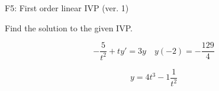\begin{exercise}
  \begin{exerciseTitle}F5: First order linear IVP (ver. 1)\end{exerciseTitle}
  \begin{exerciseStatement}
    
Find the solution to the given IVP.

    
\[-\frac{5}{t^{2}} +ty'= 3 y \hspace{1em} y( -2 ) = -\frac{129}{4}\]

  \end{exerciseStatement}
  \begin{exerciseAnswer}
    
\[y= 4 t^ 3 -1 \frac{1}{t^{2}}\]

  \end{exerciseAnswer}
\end{exercise}